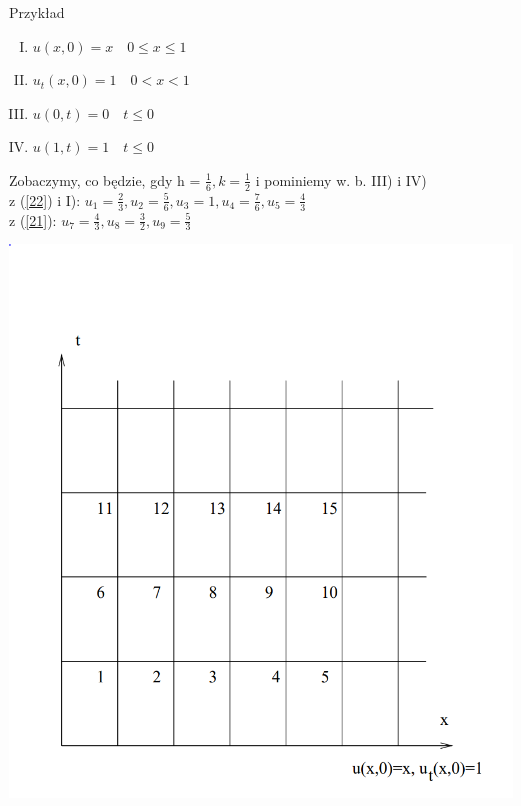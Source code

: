 \begin{frame}
  \begin{exampleblock}{Przykład}
      \begin{enumerate}[I.]
       \item $u(x,0) = x \quad 0 \le x \le 1$ \\
	\item $u_t(x,0) = 1\quad 0 < x < 1$ \\
      \item $u(0,t) = 0 \quad t \le 0$ \\
	\item $u(1,t) = 1 \quad t \le 0$
\end{enumerate}
  \end{exampleblock}
\vspace{5mm}
Zobaczymy, co będzie, gdy h = $\frac{1}{6}, k =\frac{1}{2}$ i pominiemy w. b. III) i IV) \\
\vspace{5mm}
z (\ref{22}) i I): $u_1 = \frac{2}{3}, u_2 = \frac{5}{6}, u_3 = 1, u_4 = \frac{7}{6}, u_5 = \frac{4}{3}$ \\
\vspace{3mm}
z (\ref{21}): $u_7 = \frac{4}{3}, u_8 = \frac{3}{2}, u_9 = \frac{5}{3}$
\end{frame}

\begin{frame}
 \centerline{\includegraphics[height = 1 \textheight]{img/23/stab2}}
\end{frame}

